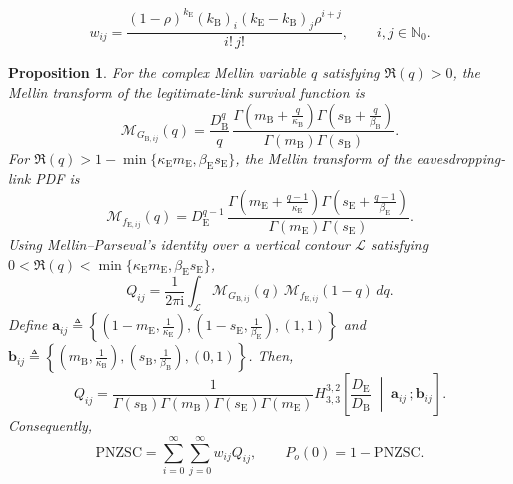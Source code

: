 \documentclass[10pt,a4paper]{amsart}
\newtheorem{proposition}{Proposition}
\begin{document}
\begin{equation}
w_{ij}
=
\frac{(1-\rho)^{k_{\mathrm E}}
(k_{\mathrm B})_i
(k_{\mathrm E}-k_{\mathrm B})_j
\rho^{i+j}}
{i!\,j!},
\qquad i,j\in\mathbb N_0.
\label{eq:corrected_weights}
\end{equation}

\begin{proposition}\label{prop:4prime}
For the complex Mellin variable \(q\) satisfying \(\Re(q)>0\), the Mellin transform of the legitimate-link survival function is
\begin{equation}
\mathcal M_{G_{\mathrm B,ij}}(q)
=
\frac{D_{\mathrm B}^q}{q}\,
\frac{\Gamma\!\left(m_{\mathrm B}+\frac{q}{\kappa_{\mathrm B}}\right)
\Gamma\!\left(s_{\mathrm B}+\frac{q}{\beta_{\mathrm B}}\right)}
{\Gamma(m_{\mathrm B})\Gamma(s_{\mathrm B})}.
\label{eq:MG1prime}
\end{equation}
For \(\Re(q)>1-\min\{\kappa_{\mathrm E}m_{\mathrm E},
\beta_{\mathrm E}s_{\mathrm E}\}\), the Mellin transform of the eavesdropping-link PDF is
\begin{equation}
\mathcal M_{f_{\mathrm E,ij}}(q)
=
D_{\mathrm E}^{q-1}\,
\frac{\Gamma\!\left(m_{\mathrm E}+\frac{q-1}{\kappa_{\mathrm E}}\right)
\Gamma\!\left(s_{\mathrm E}+\frac{q-1}{\beta_{\mathrm E}}\right)}
{\Gamma(m_{\mathrm E})\Gamma(s_{\mathrm E})}.
\label{eq:Mkappa2prime}
\end{equation}
Using Mellin--Parseval's identity over a vertical contour \(\mathcal L\) satisfying \(0<\Re(q)<\min\{\kappa_{\mathrm E}m_{\mathrm E},\beta_{\mathrm E}s_{\mathrm E}\}\),
\[
Q_{ij}
=
\frac{1}{2\pi\mathrm i}
\int_{\mathcal L}
\mathcal M_{G_{\mathrm B,ij}}(q)\,
\mathcal M_{f_{\mathrm E,ij}}(1-q)\,dq .
\]
Define \(\mathbf a_{ij}\triangleq\left\{\left(1-m_{\mathrm E},\frac{1}{\kappa_{\mathrm E}}\right),\left(1-s_{\mathrm E},\frac{1}{\beta_{\mathrm E}}\right),(1,1)\right\}\) and \(\mathbf b_{ij}\triangleq\left\{\left(m_{\mathrm B},\frac{1}{\kappa_{\mathrm B}}\right),\left(s_{\mathrm B},\frac{1}{\beta_{\mathrm B}}\right),(0,1)\right\}\).
Then,
\begin{equation}
Q_{ij}
=
\frac{1}
{\Gamma(s_{\mathrm B})\Gamma(m_{\mathrm B})
\Gamma(s_{\mathrm E})\Gamma(m_{\mathrm E})}
H_{3,3}^{3,2}\!\left[
\frac{D_{\mathrm E}}{D_{\mathrm B}}
\;\middle|\;
\mathbf a_{ij}\,;\mathbf b_{ij}
\right].
\label{eq:Qijprime}
\end{equation}
Consequently,
\begin{equation}
\mathrm{PNZSC}
=
\sum_{i=0}^{\infty}\sum_{j=0}^{\infty}w_{ij}Q_{ij},
\qquad
P_o(0)=1-\mathrm{PNZSC}.
\label{eq:PNZSCprime}
\end{equation}
\end{proposition}
\end{document}
